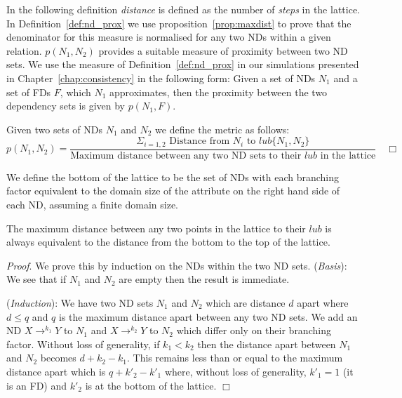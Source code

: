 In the following definition {\em distance} is defined as the number of
{\em steps} in the lattice. In Definition~\ref{def:nd_prox} we
use proposition~\ref{prop:maxdist} to prove that the denominator for
this measure is normalised for any two NDs within a given
relation. $p(N_1,N_2)$ provides a suitable measure of proximity
between two ND sets. We use the measure of
Definition~\ref{def:nd_prox} in our simulations presented in
Chapter~\ref{chap:consistency} in the following form: Given a set of NDs $N_1$ and a set of FDs $F$, which $N_1$ approximates,
then the proximity between the two dependency sets is given by
$p(N_1,F)$. 
\begin{definition}\label{def:nd_prox}
\begin{rm}
Given two sets of NDs $N_1$ and $N_2$ we define the metric as follows: 
\[
p(N_1,N_2) = \frac{\Sigma_{i = 1, 2} \mbox{ Distance from } N_i \mbox{ to }  lub \{ N_1, N_2 \}}
{\mbox{Maximum distance between any two ND sets to their $lub$ in the lattice}}
\quad\Box\]
\end{rm}
\end{definition}

We define the bottom of the
lattice to be the set of NDs with each branching factor equivalent to
the domain size of the attribute on the right hand side of each
ND, assuming a finite domain size.

\smallskip
\begin{proposition}\label{prop:maxdist}
\begin{rm}
The maximum distance between any two points in
the lattice to their $lub$ is always equivalent to the
distance from the bottom to the top of the lattice. 
\end{rm}
\end{proposition}

{\em Proof}. We prove this by induction on the NDs within the two ND sets.\newline 
\smallskip
\indent ({\em Basis}): We see that if $N_1$ and $N_2$ are empty then the
result is immediate.

\smallskip

({\em Induction}): We have two ND sets $N_1$ and $N_2$ which are distance
$d$ apart where $d \le q$ and $q$ is the maximum distance apart between
any two ND sets. We add an ND $X \to^{k_1} Y$
to $N_1$ and $X \to^{k_2} Y$ to $N_2$ which differ only
on their branching factor. Without loss of generality, if $k_1 < k_2$ then the
distance apart between $N_1$ and $N_2$ becomes $d + k_2 - k_1$. This 
remains less than or equal to the maximum distance apart which is $q + k'_2 -
k'_1$ where, without loss of generality, $k'_1 = 1$ (it is an FD) and
$k'_2$ is at the bottom of the lattice. $\Box$


